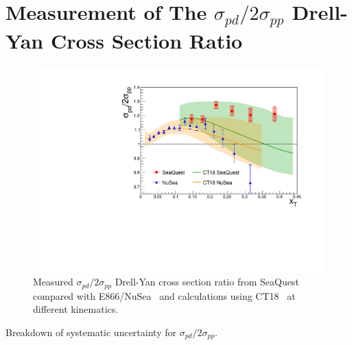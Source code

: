 \documentclass[reprint,aps,unsortedaddress,superscriptaddress,prl,floatfix,showpacs,linenumbers]{revtex4-2}
\begin{document}
\section{Measurement of The \texorpdfstring{$\sigma_{pd}/2\sigma_{pp}$}{pd/2pp} Drell-Yan Cross Section Ratio}
\begin{figure}[htbp!]
	\centering
	\includegraphics[width=\linewidth]{E906_E866_xT_CT18only.pdf}
	\caption{Measured $\sigma_{pd}/2\sigma_{pp}$ Drell-Yan cross section ratio from SeaQuest compared with E866/NuSea~\cite{towell2001}
		and calculations using CT18~\cite{hou2021} at different kinematics.}
	\label{fig:xT_csr}
\end{figure}

\begin{table}
	\centering
	\caption{Breakdown of systematic uncertainty for $\sigma_{pd}/2\sigma_{pp}$.}
	\begin{adjustbox}{max width=\linewidth}
		
	\end{adjustbox}
\end{table}
\end{document}
